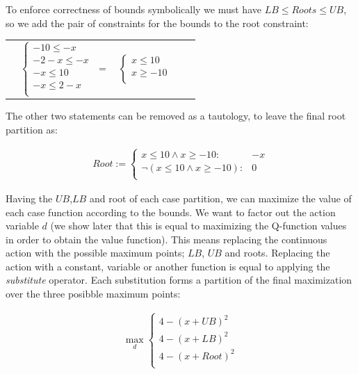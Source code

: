 \documentclass[letterpaper]{article}
\begin{document}
To enforce correctness of bounds symbolically we must have $\mathit{LB} \leq \mathit{Root}s \leq \mathit{UB}$, so we add the pair of constraints for the bounds to the root constraint:

{\footnotesize
\begin{center}
\begin{tabular}{r c c c l}
&
\hspace{-9mm} $
  \begin{cases}
-10 \leq -x \\ 
-2 -x \leq -x \\ 
-x \leq 10 \\ 
-x \leq 2 -x\\ 
  \end{cases}$
$=$
&
\hspace{-4mm}
$ \begin{cases}
x \leq 10 \\ 
x \geq -10\\ 
  \end{cases}$
\end{tabular}
\end{center}
}
The other two statements can be removed as a tautology, to leave the final root partition as: 

\begin{align*}\mathit{Root}:= 
 \begin{cases}
x \leq 10 \wedge x \geq -10:              & -x\\ 
\neg (x \leq 10 \wedge x \geq -10):    & 0\\ 
  \end{cases}
\end{align*}

Having the $\mathit{UB}$,$\mathit{LB}$ and root of each case partition, we can maximize the value of each case function according to the bounds. We want to factor out the action variable $d$ (we show later that this is equal to maximizing the Q-function values in order to obtain the value function). This means replacing the continuous action with the possible maximum points; $\mathit{LB}$, $\mathit{UB}$ and roots. Replacing the action with a constant, variable or another function is equal to applying the \emph{substitute} operator. Each substitution forms a partition of the final maximization over the three posibble maximum points: 

\begin{align*}
\max_{d}
\begin{cases}
4 - (x+ \mathit{UB})^2 \\ 
4- (x+\mathit{LB})^2 \\ 
4 - (x+\mathit{Root})^2\\ 
  \end{cases}
\end{align*}
\end{document}
